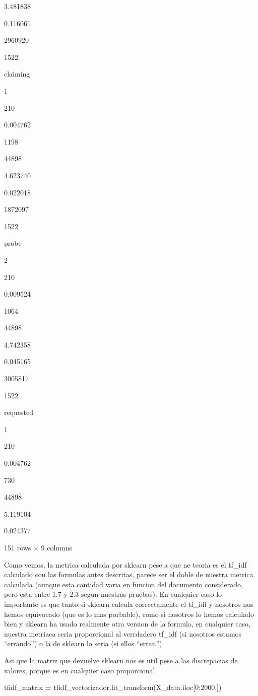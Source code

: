 \documentclass[
  11pt,
  a4paper,
]{article}
\newenvironment{Shaded}{\begin{snugshade}}{\end{snugshade}}
\newcommand{\DecValTok}[1]{\textcolor[rgb]{0.00,0.00,0.81}{#1}}
\newcommand{\NormalTok}[1]{#1}
\newcommand{\OperatorTok}[1]{\textcolor[rgb]{0.81,0.36,0.00}{\textbf{#1}}}
\begin{document}
3.481838

0.116061

2960920

1522

claiming

1

210

0.004762

1198

44898

4.623740

0.022018

1872097

1522

probe

2

210

0.009524

1064

44898

4.742358

0.045165

3005817

1522

requested

1

210

0.004762

730

44898

5.119104

0.024377

151 rows × 9 columns

Como vemos, la metrica calculada por sklearn pese a que ne teoria es el
tf\_idf calculado con las formulas antes descritas, parece ser el doble
de nuestra metrica calculada (aunque esta cantidad varia en funcion del
documento considerado, pero esta entre 1.7 y 2.3 segun nuestras
pruebas). En cualquier caso lo importante es que tanto si sklearn
calcula correctamente el tf\_idf y nosotros nos hemos equivocado (que es
lo mas porbable), como si nosotros lo hemos calculado bien y sklearn ha
usado realmente otra version de la formula, en cualquier caso, nuestra
metriaca seria proporcional al verrdadero tf\_idf (si nosotros estamos
``errando'') o la de sklearn lo seria (si ellos ``erran'')

Asi que la matriz que devuelve sklearn nos es util pese a las
discrepacias de valores, porque es en cualquier caso proporcional.

\begin{Shaded}
\begin{Highlighting}[]
\NormalTok{tfidf\_matrix }\OperatorTok{=}\NormalTok{ tfidf\_vectorizador.fit\_transform(X\_data.iloc[}\DecValTok{0}\NormalTok{:}\DecValTok{2000}\NormalTok{,])}
\end{Highlighting}
\end{Shaded}
\end{document}
